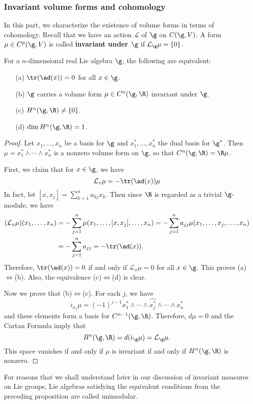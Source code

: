 \subsubsection{Invariant volume forms and cohomology}
In this part, we characterize the existence of volume forms in terms of cohomology. Recall that we have an action $\mathcal{L}$ of $\g$ on $C(\g,V)$. A form $\mu\in C^p(\g,V)$ is called \textbf{invariant under $\g$} if $\mathcal{L}_\g\mu=\{0\}$.
\begin{proposition}\label{Lie algebra invariant volume form}
For a $n$-dimensional real Lie algebra $\g$, the following are equivalent:
\begin{itemize}
\item[(a)] $\tr(\ad(x))=0$ for all $x\in\g$.
\item[(b)] $\g$ carries a volume form $\mu\in C^n(\g,\R)$ invariant under $\g$.
\item[(c)] $H^n(\g,\R)\neq\{0\}$.
\item[(d)] $\dim H^n(\g,\R)=1$.
\end{itemize}
\end{proposition}
\begin{proof}
Let $x_1,\dots,x_n$ be a basis for $\g$ and $x_1^*,\dots,x_n^*$ the dual basis for $\g^*$. Then $\mu=x_1^*\wedge\cdots\wedge x_n^*$ is a nonzero volume form on $\g$, so that $C^n(\g,\R)=\R\mu$.\par
First, we claim that for $x\in\g$, we have
\[\mathcal{L}_x\mu=-\tr(\ad(x))\mu\]
In fact, let $[x,x_j]=\sum_{k=1}^{n}a_{kj}x_k$. Then since $\R$ is regarded as a trivial $\g$-module, we have
\begin{align*}
(\mathcal{L}_x\mu)(x_1,\dots,x_n)&=-\sum_{j=1}^{n}\mu(x_1,\dots,[x,x_j],\dots,x_n)=-\sum_{j=1}^{n}a_{jj}\mu(x_1,\dots,x_j,\dots,x_n)\\
&=-\sum_{j=1}^{n}a_{jj}=-\tr(\ad(x)).
\end{align*}
Therefore, $\tr(\ad(x))=0$ if and only if $\mathcal{L}_x\mu=0$ for all $x\in\g$. This proves (a)$\Leftrightarrow$(b). Also, the equivalence (c)$\Leftrightarrow$(d) is clear.\par
Now we prove that (b)$\Leftrightarrow$(c). For each $j$, we have
\[i_{x_j}\mu=(-1)^{j-1}x_1^*\wedge\cdots\wedge\hat{x_j^*}\wedge\cdots\wedge x_n^*\]
and these elements form a basis for $C^{n-1}(\g,\R)$. Therefore, $d\mu=0$ and the Cartan Formula imply that
\[B^n(\g,\R)=d(i_\g\mu)=\mathcal{L}_\g\mu.\]
This space vanishes if and only if $\mu$ is invariant if and only if $H^n(\g,\R)$ is nonzero.
\end{proof}
For reasons that we shall understand later in our discussion of invariant measures on Lie groups, Lie algebras satisfying the equivalent conditions from the preceding proposition are called unimodular.

